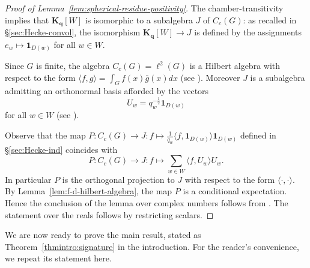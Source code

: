 \documentclass[12pt,a4paper]{amsproc}
\theoremstyle{definition}
\newcommand{\KK}{\mathbf K}
\newcommand{\one}{\mathbf 1}
\begin{document}
	

\begin{proof}[Proof of Lemma~\ref{lem:spherical-residue-positivity}] 
The chamber-transitivity implies that $\KK_{\mathbf q}[W]$ is isomorphic to a subalgebra $J$ of $C_c(G)$: as recalled in \S\ref{sec:Hecke-convol}, the isomorphism $\KK_{\mathbf q}[W] \to J$ is defined by the assignments $e_w \mapsto \one_{D(w)}$ for all $w \in W$. 

Since $G$ is finite, the algebra $C_c(G) = \ell^2(G)$ is a Hilbert algebra with respect to the form $\langle f, g\rangle = \int_G f(x)\bar g(x) dx$   (see \cite[\S13.10.1]{Dixmier}). Moreover $J$ is a subalgebra admitting an orthonormal basis afforded by the vectors 
$$U_w = q_w^{-\frac 1 2} \one_{D(w)}$$
for all $w \in W$ (see \cite[\S19.2]{Davis}). 

Observe that the map $P \colon C_c(G) \to J : f \mapsto \frac 1 {q_w}\langle f, \one_{D(w)} \rangle \one_{D(w)}$ defined in \S\ref{sec:Hecke-ind} coincides with 
$$P \colon C_c(G) \to J : f \mapsto \sum_{w \in W} \langle f, U_w\rangle U_w. $$
In particular $P$ is the orthogonal projection to $J$ with respect to the form $\langle \cdot, \cdot \rangle$. By Lemma~\ref{lem:f-d-hilbert-algebra}, the map $P$ is a conditional expectation.  Hence the conclusion of the lemma over complex numbers follows from  \cite[Lemma~1.7]{Rieffel}.   The statement over the reals follows by restricting scalars. 
\end{proof}



We are now ready to prove the main result, stated as Theorem~\ref{thmintro:signature} in the introduction. For the reader's convenience, we repeat its statement here.  
\end{document}
